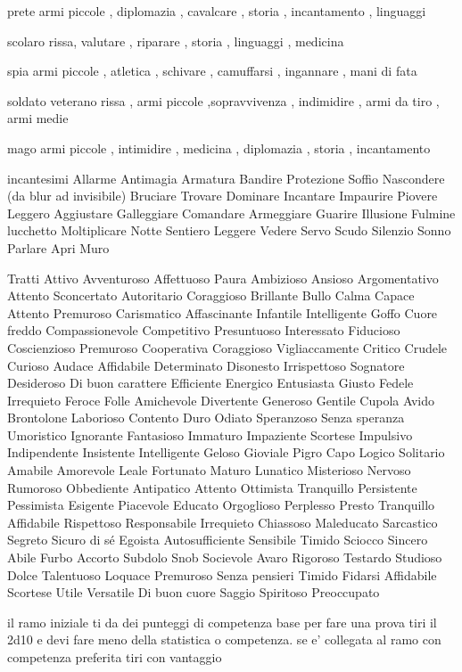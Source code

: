 \documentclass[12pt,a4paper,twoside,openany,twocolumn]{book}
\begin{document}
prete
armi piccole , diplomazia , cavalcare ,  storia , incantamento , linguaggi 

scolaro
rissa, valutare  , riparare , storia , linguaggi , medicina 

spia
armi piccole , atletica , schivare ,  camuffarsi , ingannare , mani di fata 

soldato veterano
rissa , armi piccole  ,sopravvivenza , indimidire , armi da tiro , armi medie 

mago
armi piccole , intimidire , medicina , diplomazia , storia , incantamento 


incantesimi
Allarme
Antimagia
Armatura
Bandire
Protezione
Soffio
Nascondere (da blur ad invisibile)
Bruciare
Trovare
Dominare
Incantare
Impaurire
Piovere
Leggero
Aggiustare
Galleggiare
Comandare
Armeggiare
Guarire
Illusione
Fulmine
lucchetto
Moltiplicare
Notte
Sentiero
Leggere
Vedere
Servo
Scudo
Silenzio
Sonno
Parlare
Apri
Muro



Tratti
Attivo
Avventuroso
Affettuoso
Paura
Ambizioso
Ansioso
Argomentativo
Attento
Sconcertato
Autoritario
Coraggioso
Brillante
Bullo
Calma
Capace
Attento
Premuroso
Carismatico
Affascinante
Infantile
Intelligente
Goffo
Cuore freddo
Compassionevole
Competitivo
Presuntuoso
Interessato
Fiducioso
Coscienzioso
Premuroso
Cooperativa
Coraggioso
Vigliaccamente
Critico
Crudele
Curioso
Audace
Affidabile
Determinato
Disonesto
Irrispettoso
Sognatore
Desideroso
Di buon carattere
Efficiente
Energico
Entusiasta
Giusto
Fedele
Irrequieto
Feroce
Folle
Amichevole
Divertente
Generoso
Gentile
Cupola
Avido
Brontolone
Laborioso
Contento
Duro
Odiato
Speranzoso
Senza speranza
Umoristico
Ignorante
Fantasioso
Immaturo
Impaziente
Scortese
Impulsivo
Indipendente
Insistente
Intelligente
Geloso
Gioviale
Pigro
Capo
Logico
Solitario
Amabile
Amorevole
Leale
Fortunato
Maturo
Lunatico
Misterioso
Nervoso
Rumoroso
Obbediente
Antipatico
Attento
Ottimista
Tranquillo
Persistente
Pessimista
Esigente
Piacevole
Educato
Orgoglioso
Perplesso
Presto
Tranquillo
Affidabile
Rispettoso
Responsabile
Irrequieto
Chiassoso
Maleducato
Sarcastico
Segreto
Sicuro di sé
Egoista
Autosufficiente
Sensibile
Timido
Sciocco
Sincero
Abile
Furbo
Accorto
Subdolo
Snob
Socievole
Avaro
Rigoroso
Testardo
Studioso
Dolce
Talentuoso
Loquace
Premuroso
Senza pensieri
Timido
Fidarsi
Affidabile
Scortese
Utile
Versatile
Di buon cuore
Saggio
Spiritoso
Preoccupato


il ramo iniziale ti da dei punteggi di competenza base
per fare una prova tiri il 2d10 e devi fare meno della statistica o competenza. se e' collegata al ramo con competenza preferita tiri con vantaggio
\end{document}

